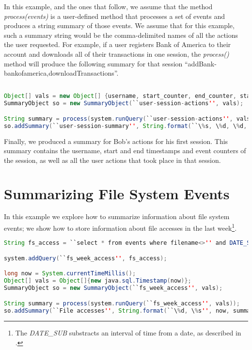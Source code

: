 In this example, and the ones that follow, we assume that the method \emph{process(events)} is a user-defined method that  processes a set of events and produces a string summary of those events. We assume that for this example, such a summary string would be the comma-delimited names of all the actions the user requested. For example, if a user registers Bank of America to their account and downloads all of their transactions in one session, the \emph{process()} method will produce the following summary for that session ``addBank-bankofamerica,downloadTransactions''.

\begin{lstlisting}[language=Java]

Object[] vals = new Object[] {username, start_counter, end_counter, start_time, end_time};
SummaryObject so = new SummaryObject(``user-session-actions'', vals);

String summary = process(system.runQuery(``user-session-actions'', vals));
so.addSummary(``user-session-summary'', String.format(``\%s, \%d, \%d, \%s, \%s'', username, start_counter, end_counter, start_time, end_time, summary));

\end{lstlisting}

\noindent
Finally, we produced a summary for Bob's actions for his first session. This summary contains the username, start and end timestamps and event counters of the session, as well as all the user actions that took place in that session.

\section{Summarizing File System Events}
\label{sum:fs}
In this example we explore how to summarize information about file system events; we show how to store information about file accesses in the last week\footnote{The \emph{DATE\_SUB} substracts an interval of time from a date, as described in \cite{pgsql-gen}.}.

\begin{lstlisting}[language=Java]
String fs_access = ``select * from events where filename<>'' and DATE_SUB(?, INTERVAL 7 DAY)'';

system.addQuery(``fs_week_access'', fs_access);

long now = System.currentTimeMillis();
Object[] vals = Object[]{new java.sql.Timestamp(now)};
SummaryObject so = new SummaryObject(``fs_week_access'', vals);

String summary = process(system.runQuery(``fs_week_access'', vals));
so.addSummary(``File accesses'', String.format(``\%d, \%s'', now, summary));
\end{lstlisting}

